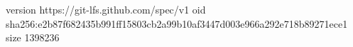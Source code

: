version https://git-lfs.github.com/spec/v1
oid sha256:e2b87f682435b991ff15803cb2a99b10af3447d003e966a292e718b89271ece1
size 1398236

